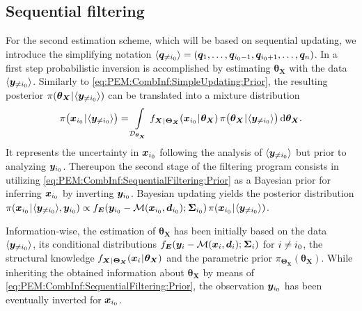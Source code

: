 \subsection{Sequential filtering} \label{sec:PEM:CombInf:SequentialFiltering}
For the second estimation scheme, which will be based on sequential updating,
we introduce the simplifying notation \(\langle{\bm{q}_{\neq i_0}}\rangle = (\bm{q}_1,\ldots,\bm{q}_{i_0-1},\bm{q}_{i_0+1},\ldots,\bm{q}_n)\).
In a first step probabilistic inversion is accomplished by estimating \(\bm{\theta}_{\bm{X}}\) with the data \(\langle{\bm{y}_{\neq i_0}}\rangle\).
Similarly to \cref{eq:PEM:CombInf:SimpleUpdating:Prior}, the resulting posterior \(\pi(\bm{\theta}_{\bm{X}} {\:\!}|{\:\!} \langle{\bm{y}_{\neq i_0}}\rangle)\) can be translated into a mixture distribution
\begin{equation} \label{eq:PEM:CombInf:SequentialFiltering:Prior}
  \pi \big( \bm{x}_{\analyzed} \cond \tuple{\bm{y}_{\notanalyzed}} \big) = \int\limits_{\mathcal{D}_{\bm{\theta}_{\bm{X}}}}
  f_{\bm{X} \cond \bm{\Theta}_{\bm{X}}} (\bm{x}_{\analyzed} \cond \bm{\theta}_{\bm{X}}) \, \pi \big( \bm{\theta}_{\bm{X}} \cond \tuple{\bm{y}_{\notanalyzed}} \big) \, \mathrm{d} \bm{\theta}_{\bm{X}}.
\end{equation}
It represents the uncertainty in \(\bm{x}_{i_0}\) following the analysis of \(\langle{\bm{y}_{\neq i_0}}\rangle\) but prior to analyzing \(\bm{y}_{i_0}\).
Thereupon the second stage of the filtering program consists in utilizing \cref{eq:PEM:CombInf:SequentialFiltering:Prior} as a Bayesian prior for inferring \(\bm{x}_{i_0}\) by inverting \(\bm{y}_{i_0}\).
Bayesian updating yields the posterior distribution \(\pi(\bm{x}_{i_0} {\:\!}|{\:\!} \langle{\bm{y}_{\neq i_0}}\rangle,\bm{y}_{i_0})
\propto f_{\bm{E}} (\bm{y}_{i_0}-\mathcal{M}(\bm{x}_{i_0},\bm{d}_{i_0}) ;{\:\!} \bm{\Sigma}_{i_0}) \, \pi(\bm{x}_{i_0} {\:\!}|{\:\!} \langle{\bm{y}_{\neq i_0}}\rangle)\).
\par %
Information-wise, the estimation of \(\bm{\theta}_{\bm{X}}\) has been initially based on the data \(\langle{\bm{y}_{\neq i_0}}\rangle\),
its conditional distributions \(f_{\bm{E}} (\bm{y}_i-\mathcal{M}(\bm{x}_i,\bm{d}_i) ;{\:\!} \bm{\Sigma}_i)\) for \(i \neq i_0\),
the structural knowledge \(f_{\bm{X} {\:\!}|{\:\!} \bm{\Theta}_{\bm{X}}} (\bm{x}_i {\:\!}|{\:\!} \bm{\theta}_{\bm{X}})\) and the parametric prior \(\pi_{\bm{\Theta}_{\bm{X}}} (\bm{\theta}_{\bm{X}})\).
While inheriting the obtained information about \(\bm{\theta}_{\bm{X}}\) by means of \cref{eq:PEM:CombInf:SequentialFiltering:Prior},
the observation \(\bm{y}_{i_0}\) has been eventually inverted for \(\bm{x}_{i_0}\).

